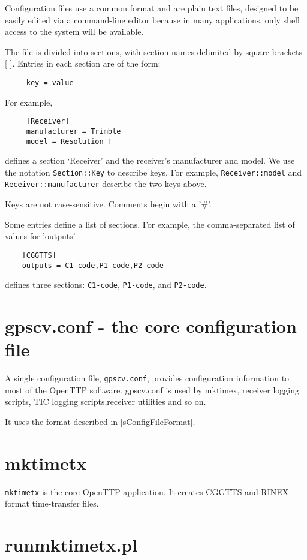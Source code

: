 \documentclass[11pt,a4paper,openany,oneside]{book}
\newcommand{\cc}[1]{{\small\texttt{#1}}}
\begin{document}
Configuration files use a common format and are plain text files, designed to be easily edited via a command-line
editor because in many applications, only shell access to the system will be available.

The file is divided into sections, with section names delimited by square brackets [ ]. Entries in each section
are of the form:
\begin{lstlisting}
	 key = value
\end{lstlisting}
For example,
\begin{lstlisting}
	 [Receiver]
	 manufacturer = Trimble
	 model = Resolution T
\end{lstlisting}
defines a section `Receiver' and the receiver's manufacturer and model. 
We use the notation \cc{Section::Key} to describe keys. For example,
\cc{Receiver::model} and \cc{Receiver::manufacturer} describe the two keys above.

Keys are not case-sensitive. Comments begin with a '\#'.

Some entries define a list of sections. For example, the comma-separated list of values for 'outputs' 
\begin{lstlisting}
	[CGGTTS]
	outputs = C1-code,P1-code,P2-code
\end{lstlisting}
defines three sections: \cc{C1-code}, \cc{P1-code}, and \cc{P2-code}.


\section{gpscv.conf - the core configuration file \label{sgpscvconf} }

A single configuration file, \cc{gpscv.conf}, provides configuration information to most of the
OpenTTP software. 
gpscv.conf is used by mktimex, receiver logging scripts, TIC logging scripts,receiver utilities and so on.

It uses the format described in \ref{sConfigFileFormat}.
\section{mktimetx}

\cc{mktimetx} is the core OpenTTP application. It creates CGGTTS and RINEX-format time-transfer files.


\section{runmktimetx.pl \label{runmktimetx}}
\end{document}
